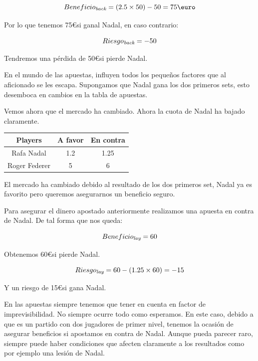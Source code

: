   
\begin{displaymath}
  Beneficio_\emph{back} = (2.5 \times 50) - 50 =  75\euro  
\end{displaymath}

Por lo que tenemos 75\euro si ganal Nadal, en caso contrario:
 
 \begin{displaymath}
  Riesgo_\emph{back} = - 50 
\end{displaymath}

Tendremos una pérdida de 50\euro si pierde Nadal.

En el mundo de las apuestas, influyen todos los pequeños factores que al aficionado se les escapa. Supongamos que Nadal gana los dos primeros sets, esto desemboca en cambios en la tabla de apuestas. 

Vemos ahora que el mercado ha cambiado. Ahora la cuota de Nadal ha bajado claramente.
   
 \begin{center}
    \begin{tabular}{| c | c | c |}
      \hline
      \hline
      \textbf{Players} & \textbf{A favor} & \textbf{En contra}\\
      \hline
      \hline
      Rafa Nadal & 1.2 & 1.25\\
      \hline
      \hline
      Roger Federer & 5 & 6\\
      \hline
      \hline
    \end{tabular}
  \end{center}
  
  
  El mercado ha cambiado debido al resultado de los dos primeros set, Nadal ya es favorito pero queremos asegurarnos un beneficio seguro.
  
Para asegurar el dinero apostado anteriormente realizamos una apuesta en contra de Nadal. De tal forma que nos queda:

  \begin{displaymath}
  Beneficio_\emph{lay} = 60 
  \end{displaymath} 
  
   Obtenemos 60\euro si pierde Nadal.
   
   \begin{displaymath}
  Riesgo_\emph{lay} = 60 - (1.25 \times 60) = -15
  \end{displaymath} 
  
  Y un riesgo de 15\euro si gana Nadal.
  
En las apuestas siempre tenemos que tener en cuenta en factor de imprevisibilidad. No siempre ocurre todo como esperamos. En este caso, debido a que es un partido con dos jugadores de primer nivel, tenemos la ocasión de asegurar beneficios si apostamos en contra de Nadal. Aunque pueda parecer raro, siempre puede haber condiciones que afecten claramente a los resultados como por ejemplo una lesión de Nadal.
	 
